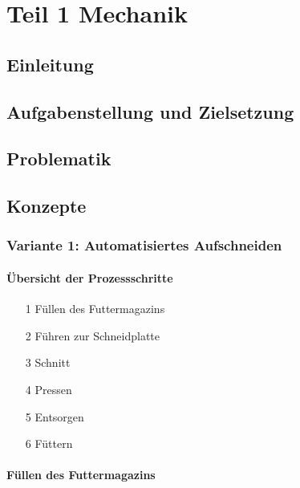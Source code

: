 \chapter{Teil 1 Mechanik}
\section{Einleitung}
\section{Aufgabenstellung und Zielsetzung}
\section{Problematik}
\newpage
\section{Konzepte} 

\subsection{Variante 1: Automatisiertes Aufschneiden} 
\subsubsection{Übersicht der Prozessschritte}
\begin{itemize}
\item[1] Füllen des Futtermagazins
\item[2] Führen zur Schneidplatte
\item[3] Schnitt
\item[4] Pressen
\item[5] Entsorgen
\item[6] Füttern
\end{itemize}

\subsubsection{Füllen des Futtermagazins}

